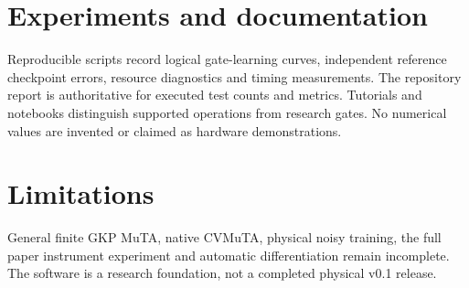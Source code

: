 \documentclass{article}
\begin{document}
\section{Experiments and documentation}
Reproducible scripts record logical gate-learning curves, independent
reference checkpoint errors, resource diagnostics and timing measurements.
The repository report is authoritative for executed test counts and metrics.
Tutorials and notebooks distinguish supported operations from research gates.
No numerical values are invented or claimed as hardware demonstrations.
\section{Limitations}
General finite GKP MuTA, native CVMuTA, physical noisy training, the full
paper instrument experiment and automatic differentiation remain incomplete.
The software is a research foundation, not a completed physical v0.1 release.
\end{document}
